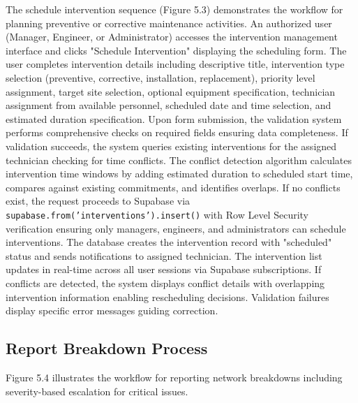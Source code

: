 The schedule intervention sequence (Figure 5.3) demonstrates the workflow for planning preventive or corrective maintenance activities. An authorized user (Manager, Engineer, or Administrator) accesses the intervention management interface and clicks "Schedule Intervention" displaying the scheduling form. The user completes intervention details including descriptive title, intervention type selection (preventive, corrective, installation, replacement), priority level assignment, target site selection, optional equipment specification, technician assignment from available personnel, scheduled date and time selection, and estimated duration specification. Upon form submission, the validation system performs comprehensive checks on required fields ensuring data completeness. If validation succeeds, the system queries existing interventions for the assigned technician checking for time conflicts. The conflict detection algorithm calculates intervention time windows by adding estimated duration to scheduled start time, compares against existing commitments, and identifies overlaps. If no conflicts exist, the request proceeds to Supabase via \texttt{supabase.from('interventions').insert()} with Row Level Security verification ensuring only managers, engineers, and administrators can schedule interventions. The database creates the intervention record with "scheduled" status and sends notifications to assigned technician. The intervention list updates in real-time across all user sessions via Supabase subscriptions. If conflicts are detected, the system displays conflict details with overlapping intervention information enabling rescheduling decisions. Validation failures display specific error messages guiding correction.

\subsection{Report Breakdown Process}

Figure 5.4 illustrates the workflow for reporting network breakdowns including severity-based escalation for critical issues.

